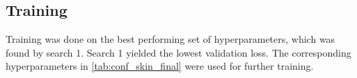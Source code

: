 



\subsection{Training}
Training was done on the best performing set of hyperparameters, which was found by search 1.
Search 1 yielded the lowest validation loss.
The corresponding hyperparameters in \cref{tab:conf_skin_final} were used for further training.

